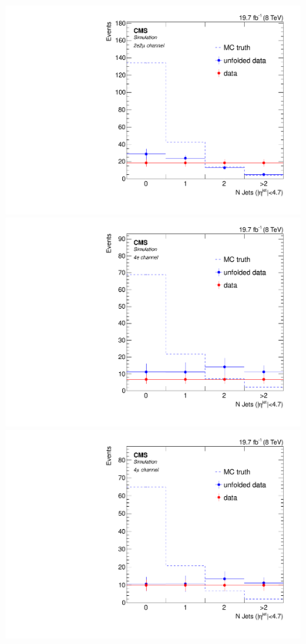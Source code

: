 \begin{figure}[hbtp]
\begin{center}
    \includegraphics[width=0.8\cmsFigWidth]{Figures/Unfolding/MCTests/Biased_Distributions/Jets_ZZTo2e2m_Mad_fr_SVD_2}
    \includegraphics[width=0.8\cmsFigWidth]{Figures/Unfolding/MCTests/Biased_Distributions/Jets_ZZTo4e_Mad_fr_SVD_4}     
    \includegraphics[width=0.8\cmsFigWidth]{Figures/Unfolding/MCTests/Biased_Distributions/Jets_ZZTo4m_Mad_fr_SVD_4}     

\end{center}
\end{figure}
